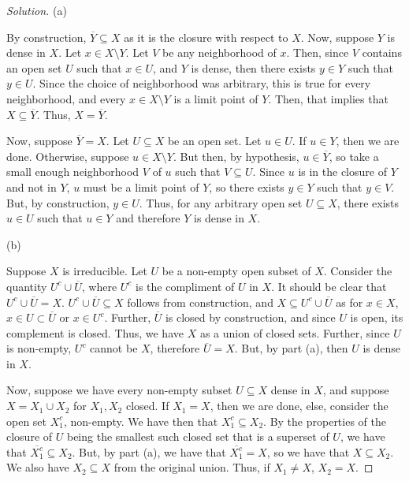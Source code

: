 \documentclass[10pt]{article}
\begin{document}
\begin{proof}[Solution]
(a)

By construction, $\overline{Y} \subseteq X$ as it is the closure with respect to $X$. Now, suppose $Y$ is dense in $X$. Let $ x \in X \setminus Y$. Let $V$ be any neighborhood of $x$. Then, since $V$ contains an open set $U$ such that $x \in U$, and $Y$ is dense, then there exists $y \in Y$ such that $y \in U$. Since the choice of neighborhood was arbitrary, this is true for every neighborhood, and every $x \in X \setminus Y$ is a limit point of $Y$. Then, that implies that $X \subseteq \overline{Y}$. Thus, $X = \overline{Y}$.

Now, suppose $\overline{Y} = X$. Let $U \subseteq X$ be an open set. Let $ u \in U$. If $u \in Y$, then we are done. Otherwise, suppose $u \in X \setminus Y$. But then, by hypothesis, $u \in \overline{Y}$, so take a small enough neighborhood $V$ of $u$ such that $V \subseteq U$. Since $u$ is in the closure of $Y$ and not in $Y$, $u$ must be a limit point of $Y$, so there exists $y \in Y$ such that $y \in V$. But, by construction, $y \in U$. Thus, for any arbitrary open set $U \subseteq X$, there exists $u \in U$ such that $u \in Y$ and therefore $Y$ is dense in $X$.

(b)

Suppose $X$ is irreducible. Let $U$ be a non-empty open subset of $X$. Consider the quantity $U^c \cup \overline{U}$, where $U^c$ is the compliment of $U$ in $X$. It should be clear that $U^c \cup \overline{U} = X$. $U^c \cup \overline{U}\subseteq X$ follows from construction, and $X \subseteq U^c \cup \overline{U}$ as for $x \in X$, $x \in U \subset \overline{U}$ or $x \in U^c$. Further, $\overline{U}$ is closed by construction, and since $U$ is open, its complement is closed. Thus, we have $X$ as a union of closed sets. Further, since $U$ is non-empty, $U^c$ cannot be $X$, therefore $\overline{U} = X$. But, by part (a), then $U$ is dense in $X$.

Now, suppose we have every non-empty subset $U \subseteq X$ dense in $X$, and suppose $X = X_1 \cup X_2$ for $X_1,X_2$ closed. If $X_1 = X$, then we are done, else, consider the open set $X_1^c$, non-empty. We have then that $X_1^c \subseteq X_2$. By the properties of the closure of $U$ being the smallest such closed set that is a superset of $U$, we have that  $\overline{X_1^c} \subseteq X_2$. But, by part (a), we have that $\overline{X_1^c} = X$, so we have that $X \subseteq X_2$. We also have $X_2 \subseteq X$ from the original union. Thus, if $X_1 \not= X$, $X_2 = X$.


\end{proof}
\end{document}
